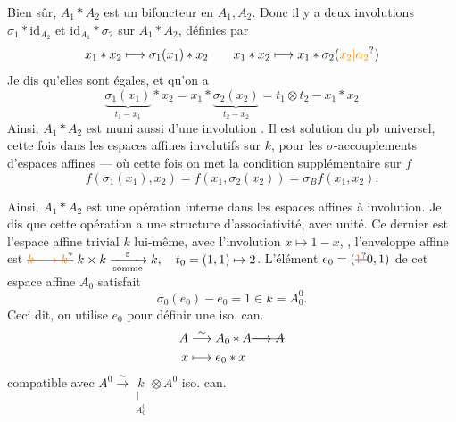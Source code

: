  Bien sûr, $A_1\ast A_2$ est un bifoncteur en $A_1,A_2$. Donc il y a deux involutions $\sigma_1\ast\mathrm{id}_{A_2}$ et $\mathrm{id}_{A_1}\ast\sigma_2$ sur $A_1\ast A_2$, définies par
\[
 x_1\ast x_2\longmapsto\sigma_1(x_1)\ast x_2\qquad
 x_1\ast x_2\longmapsto x_1\ast\sigma_2(\unsure{x_2|\alpha_2})
\]
Je dis qu'elles sont égales, et qu'on a
\[
 \underbrace{\sigma_1(x_1)}_{t_1-x_1}\ast x_2=x_1\ast\underbrace{\sigma_2(x_2)}_{t_2-x_2}=t_1\otimes t_2-x_1\ast x_2
\]
Ainsi, $A_1\ast A_2$ est muni aussi d'une involution . Il est solution du pb universel, cette fois dans les espaces affines involutifs sur $k$, pour les $\sigma$-accouplements d'espaces affines --- où cette fois on met la condition supplémentaire sur $f$
\[
 f(\sigma_1(x_1),x_2)=f(x_1,\sigma_2(x_2))=\sigma_B f(x_1,x_2).
\]

Ainsi, $A_1\ast A_2$ est une opération interne dans les espaces affines à involution. Je dis que cette opération a une structure d'associativité, avec  unité.
Ce dernier est l'espace affine trivial $k$ lui-même, avec l'involution $x\longmapsto1-x$,  , l'enveloppe affine est $\deleted{\unsure{k\longrightarrow k}}\ k\times k\xrightarrow[\text{somme}]{\varepsilon}k,\quad t_0=(1,1)\mapsto2$.
L'élément $e_0=(\deleted{\unsure{1}}0,1)$ de cet espace affine $A_0$ satisfait
\[
 \sigma_0(e_0)-e_0=1\in k=A_0^0.
\]
Ceci dit, on utilise $e_0$ pour définir une iso. can.
\[
 \begin{aligned}
 A&\overset{\sim}{\longrightarrow} A_0\ast A\deleted{\longrightarrow A}\\
 x&\longmapsto e_0\ast x
 \end{aligned}
\]
compatible avec $A^0\overset{\sim}{\longrightarrow}\underset{\substack{\Vert\\A_0^0}}{k}\otimes A^0$ iso. can.

